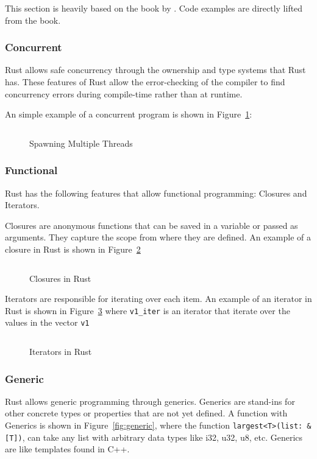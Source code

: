 \documentclass{article}
\newcommand{\rust}[1]{\inputminted{rust}{samples/rust/#1.rs}}
\newcommand{\rustin}[1]{\texttt{#1}}
\begin{document}
  This section is heavily based on the book  by
  \cite{klabnik_nichols_2018}. Code examples are directly lifted from the book.

  \subsubsection{Concurrent}
  Rust allows safe concurrency through the ownership and type systems that Rust
  has. These features of Rust allow the error-checking of the compiler to find
  concurrency errors during compile-time rather than at runtime.

  An simple example of a concurrent program is shown in Figure~\ref{fig:thread}:

  \begin{figure}[ht]
    \rust{thread}
    \caption{Spawning Multiple Threads}
    \label{fig:thread}
  \end{figure}

  \subsubsection{Functional}
  Rust has the following features that allow functional programming: Closures
  and Iterators.

  Closures are anonymous functions that can be saved in a variable or passed as
  arguments. They capture the scope from where they are defined. An example of a
  closure in Rust is shown in Figure~\ref{fig:closure}

  \begin{figure}[ht]
    \rust{thread}
    \caption{Closures in Rust}
    \label{fig:closure}
  \end{figure}

  Iterators are responsible for iterating over each item. An example of an
  iterator in Rust is shown in Figure~\ref{fig:iterator} where \rustin{v1_iter}
  is an iterator that iterate over the values in the vector \rustin{v1}

  \begin{figure}[ht]
    \rust{iterator}
    \caption{Iterators in Rust}
    \label{fig:iterator}
  \end{figure}

  \subsubsection{Generic}
  Rust allows generic programming through generics. Generics are stand-ins for
  other concrete types or properties that are not yet defined. A function with
  Generics is shown in Figure~\ref{fig:generic}, where the function
  \rustin{largest<T>(list: &[T])}, can take any list with arbitrary data types
  like i32, u32, u8, etc. Generics are like templates found in C++.
\end{document}
